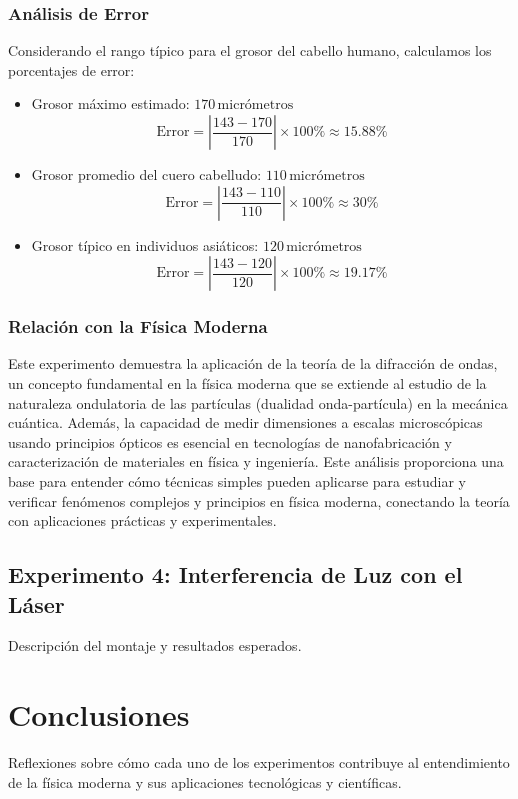\subsubsection{Análisis de Error}
Considerando el rango típico para el grosor del cabello humano, calculamos los porcentajes de error:
\begin{itemize}
    \item Grosor máximo estimado: \(170 \, \text{micrómetros}\)
    \[
    \text{Error} = \left| \frac{143 - 170}{170} \right| \times 100\% \approx 15.88\%
    \]
    \item Grosor promedio del cuero cabelludo: \(110 \, \text{micrómetros}\)
    \[
    \text{Error} = \left| \frac{143 - 110}{110} \right| \times 100\% \approx 30\%
    \]
    \item Grosor típico en individuos asiáticos: \(120 \, \text{micrómetros}\)
    \[
    \text{Error} = \left| \frac{143 - 120}{120} \right| \times 100\% \approx 19.17\%
    \]
\end{itemize}

\subsubsection{Relación con la Física Moderna}
Este experimento demuestra la aplicación de la teoría de la difracción de ondas, un concepto fundamental en la física moderna que se extiende al estudio de la naturaleza ondulatoria de las partículas (dualidad onda-partícula) en la mecánica cuántica. Además, la capacidad de medir dimensiones a escalas microscópicas usando principios ópticos es esencial en tecnologías de nanofabricación y caracterización de materiales en física y ingeniería. Este análisis proporciona una base para entender cómo técnicas simples pueden aplicarse para estudiar y verificar fenómenos complejos y principios en física moderna, conectando la teoría con aplicaciones prácticas y experimentales.


\subsection{Experimento 4: Interferencia de Luz con el Láser}
Descripción del montaje y resultados esperados.

\section{Conclusiones}
Reflexiones sobre cómo cada uno de los experimentos contribuye al entendimiento de la física moderna y sus aplicaciones tecnológicas y científicas.
